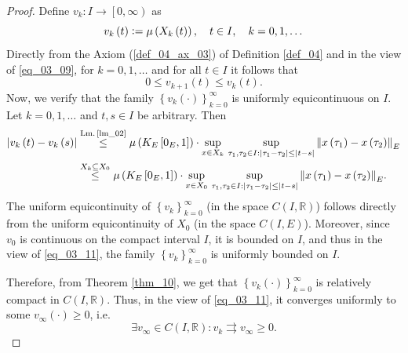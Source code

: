 \documentclass[reqno]{amsart}
\numberwithin{equation}{section}
\theoremstyle{definition}
\theoremstyle{remark}
\newcommand{\axiomRef}[1]{\textrm{Axiom (\ref{#1})}}
\newcommand{\ball}[3]{K_{#1}\sbr{#2,#3}}
\newcommand{\br}[1]{\left(#1\right)}
\newcommand{\C}[2]{C\br{#1,#2}}
\newcommand{\cbr}[1]{\left\{#1\right\}}
\newcommand{\definitionRef}[1]{\textrm{Definition \ref{#1}}}
\newcommand{\defeq}{\vcentcolon=}
\newcommand{\leqText}[1]{\stackrel{#1}{\leq}}
\newcommand{\lmRef}[1]{\textrm{Lm.\,\ref{#1}}}
\newcommand{\lsrbr}[1]{\left[#1\right)}
\newcommand{\R}{\mathbb{R}}
\newcommand{\sbr}[1]{\left[#1\right]}
\newcommand{\st}{\!:}
\newcommand{\theoremRef}[1]{\textrm{Theorem \ref{#1}}}
\begin{document}
\begin{proof}
	Define $v_k\st{I}\rightarrow\lsrbr{0,\infty}$ as
	\begin{equation}\label{eq_03_10}
		v_k\br{t}\defeq\mu\br{X_k\br{t}},\quad{t}\in{I},\quad{k}=0,1,\dots
	\end{equation}
	Directly from the \axiomRef{def_04_ax_03} of \definitionRef{def_04} and in the view of \eqref{eq_03_09}, for $k=0,1,\dots$ and for all $t\in{I}$ it follows that
	\begin{equation}\label{eq_03_11}
		0\leq{v}_{k+1}\br{t}\leq{v}_k\br{t}.
	\end{equation}
	Now, we verify that the family $\cbr{v_k\br{\cdot}}_{k=0}^\infty$ is uniformly equicontinuous on $I$. Let $k=0,1,\dots$ and $t,s\in{I}$ be arbitrary. Then
	\begin{equation*}
		\begin{aligned}
			\abs{v_k\br{t}-v_k\br{s}}&\leqText{\lmRef{lm_02}}\mu\br{\ball{E}{0_E}{1}}\cdot\sup_{x\in{X_k}}\,\sup_{\tau_1,\tau_2\in{I}\,\st\abs{\tau_1-\tau_2}\leq\abs{t-s}}\norm{x\br{\tau_1}-x\br{\tau_2}}_E\\
			&\leqText{X_k\subseteq{X}_0}\mu\br{\ball{E}{0_E}{1}}\cdot\sup_{x\in{X_0}}\,\sup_{\tau_1,\tau_2\in{I}\,\st\abs{\tau_1-\tau_2}\leq\abs{t-s}}\norm{x\br{\tau_1}-x\br{\tau_2}}_E.
		\end{aligned}
	\end{equation*}
	The uniform equicontinuity of $\cbr{v_k}_{k=0}^\infty$ (in the space $\C{I}{\R}$) follows directly from the uniform equicontinuity of $X_0$ (in the space $\C{I}{E}$). Moreover, since $v_0$ is continuous on the compact interval $I$, it is bounded on $I$, and thus in the view of \eqref{eq_03_11}, the family $\cbr{v_k}_{k=0}^\infty$ is uniformly bounded on $I$.
	
	Therefore, from \theoremRef{thm_10}, we get that $\cbr{v_k\br{\cdot}}_{k=0}^\infty$ is relatively compact in $\C{I}{\R}$. Thus, in the view of \eqref{eq_03_11}, it converges uniformly to some $v_{\infty}\br{\cdot}\geq0$, i.e.
	\begin{equation}\label{eq_03_12}
		\exists{v}_{\infty}\in\C{I}{\R}\st{v}_k\rightrightarrows{v}_{\infty}\geq0.
	\end{equation}
	

\end{proof}
\end{document}
